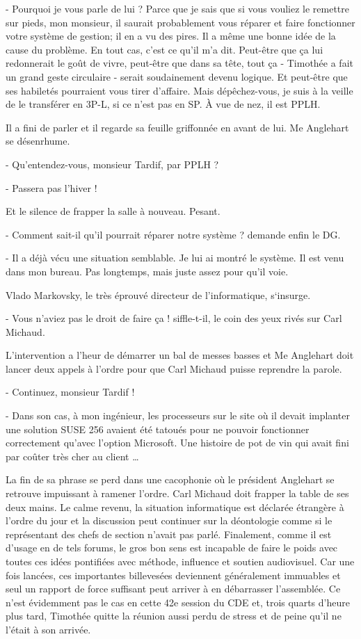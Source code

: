 - Pourquoi je vous parle de lui ? Parce que je sais que si vous vouliez le remettre sur pieds, mon monsieur, il saurait probablement vous réparer et faire fonctionner votre système de gestion; il en a vu des pires. Il a même une bonne idée de la cause du problème. En tout cas, c’est ce qu’il m’a dit. Peut-être que ça lui redonnerait le goût de vivre, peut-être que dans sa tête, tout ça - Timothée a fait un grand geste circulaire - serait soudainement devenu logique. Et peut-être que ses habiletés pourraient vous tirer d’affaire. Mais dépêchez-vous, je suis à la veille de le transférer en 3P-L, si ce n’est pas en SP. À vue de nez, il est PPLH.

Il a fini de parler et il regarde sa feuille griffonnée en avant de lui. Me Anglehart se désenrhume.

- Qu’entendez-vous, monsieur Tardif, par PPLH ?

- Passera pas l’hiver !

Et le silence de frapper la salle à nouveau. Pesant.

- Comment sait-il qu’il pourrait réparer notre système ? demande enfin le DG.

- Il a déjà vécu une situation semblable. Je lui ai montré le système. Il est venu dans mon bureau. Pas longtemps, mais juste assez pour qu’il voie.

Vlado Markovsky, le très éprouvé directeur de l’informatique, s‘insurge.

- Vous n’aviez pas le droit de faire ça ! siffle-t-il, le coin des yeux rivés sur Carl Michaud.

L’intervention a l’heur de démarrer un bal de messes basses et Me Anglehart doit lancer deux appels à l’ordre pour que Carl Michaud puisse reprendre la parole.

- Continuez, monsieur Tardif !

- Dans son cas, à mon ingénieur, les processeurs sur le site où il devait implanter une solution SUSE 256 avaient été tatoués pour ne pouvoir fonctionner correctement qu’avec l’option Microsoft. Une histoire de pot de vin qui avait fini par coûter très cher au client …

La fin de sa phrase se perd dans une cacophonie où le président Anglehart se retrouve impuissant à ramener l’ordre. Carl Michaud doit frapper la table de ses deux mains. Le calme revenu, la situation informatique est déclarée étrangère à l’ordre du jour et la discussion peut continuer sur la déontologie comme si le représentant des chefs de section n’avait pas parlé. Finalement, comme il est d’usage en de tels forums, le gros bon sens est incapable de faire le poids avec toutes ces idées pontifiées avec méthode, influence et soutien audiovisuel. Car une fois lancées, ces importantes billevesées deviennent généralement immuables et seul un rapport de force suffisant peut arriver à en débarrasser l’assemblée. Ce n’est évidemment pas le cas en cette 42e session du CDE et, trois quarts d’heure plus tard, Timothée quitte la réunion aussi perdu de stress et de peine qu’il ne l’était à son arrivée.

